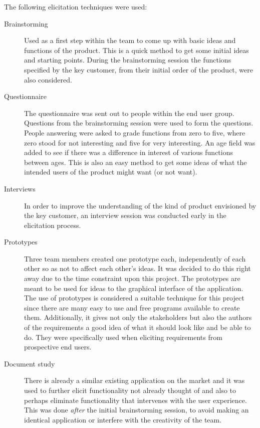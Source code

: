 \documentclass[10pt,a4paper]{article}
\begin{document}
The following elicitation techniques were used:
\begin{description}
\item[Brainstorming] Used as a first step within the team to come up with basic ideas and functions of the product. This is a quick method to get some initial ideas and starting points. During the brainstorming session the functions specified by the key customer, from their initial order of the product, were also considered.

\item[Questionnaire] The questionnaire was sent out to people within the end user group. Questions from the brainstorming session were used to form the questions. People answering were asked to grade functions from zero to five, where zero stood for not interesting and five for very interesting. An age field was added to see if there was a difference in interest of various functions between ages. This is also an easy method to get some ideas of what the intended users of the product might want (or not want).

\item[Interviews] In order to improve the understanding of the kind of product envisioned by the key customer, an interview session was conducted early in the elicitation process. 

\item[Prototypes] Three team members created one prototype each, independently of each other so as not to affect each other's ideas. It was decided to do this right away due to the time constraint upon this project. The prototypes are meant to be used for ideas to the graphical interface of the application. The use of prototypes is considered a suitable technique for this project since there are many easy to use and free programs available to create them. Additionally, it gives not only the stakeholders but also the authors of the requirements a good idea of what it should look like and be able to do. They were specifically used when eliciting requirements from prospective end users.

\item[Document study] There is already a similar existing application on the market and it was used to further elicit functionality not already thought of and also to perhaps eliminate functionality that intervenes with the user experience. This was done \textit{after} the initial brainstorming session, to avoid making an identical application or interfere with the creativity of the team. 


\end{description}
\end{document}
